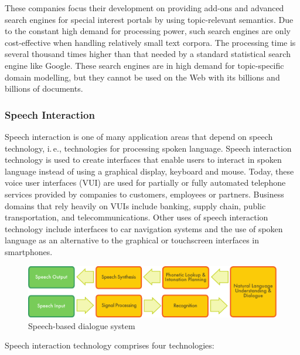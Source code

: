 \documentclass[]{../../metanetpaper}
\begin{document}
\begin{multicols}{2}
These companies focus their development on providing add-ons and advanced search engines for special interest portals by using topic-relevant semantics. Due to the constant high demand for processing power, such search engines are only cost-effective when handling relatively small text corpora. The processing time is several thousand times higher than that needed by a standard statistical search engine like Google. These search engines are in high demand for topic-specific domain modelling, but they cannot be used on the Web with its billions and billions of documents.



\subsubsection{Speech Interaction}

Speech interaction is one of many application areas that depend on speech technology, i.\,e., technologies for processing spoken language. Speech interaction technology is used to create interfaces that enable users to interact in spoken language instead of using a graphical display, keyboard and mouse.  Today, these voice user interfaces (VUI) are used for partially or fully automated telephone services provided by companies to customers, employees or partners. Business domains that rely heavily on VUIs include banking, supply chain, public transportation, and telecommunications. Other uses of speech interaction technology include interfaces to car navigation systems and the use of spoken language as an alternative to the graphical or touchscreen interfaces in smartphones.

\begin{figure}[htb]
  \center
  \includegraphics[width=\textwidth]{../_media/english/simple_speech-based_dialogue_architecture}
  \caption{Speech-based dialogue system}
  \label{fig:dialoguearch_en}
\end{figure}

Speech interaction technology comprises four technologies:


\end{multicols}
\end{document}
